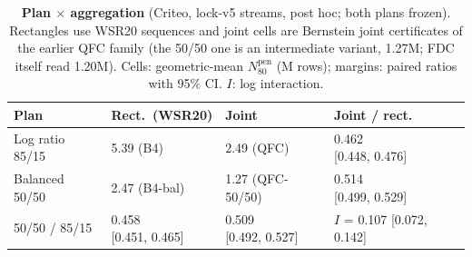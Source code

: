 \documentclass[sigconf,anonymous,review]{acmart}
\newcommand{\Npen}{N_{80}^{\text{pen}}}
\begin{document}
\begin{table}[H]
\caption{\textbf{Plan $\times$ aggregation} (Criteo, lock-v5 streams, post hoc; both plans frozen). Rectangles use WSR20 sequences and joint cells are Bernstein joint certificates of the earlier QFC family (the 50/50 one is an intermediate variant, 1.27M; FDC itself read 1.20M). Cells: geometric-mean $\Npen$ (M rows); margins: paired ratios with 95\% CI. $I$: log interaction.}
\label{tab:plan}
\footnotesize
\setlength{\tabcolsep}{3pt}
\begin{tabular}{@{}llll@{}}
\toprule
Plan & Rect.\ (WSR20) & Joint & Joint / rect. \\
\midrule
Log ratio 85/15 & 5.39 (B4) & 2.49 (QFC) & \makecell[l]{0.462\\{}[0.448, 0.476]} \\
Balanced 50/50 & 2.47 (B4-bal) & 1.27 (QFC-50/50) & \makecell[l]{0.514\\{}[0.499, 0.529]} \\
50/50 / 85/15 & \makecell[l]{0.458\\{}[0.451, 0.465]} & \makecell[l]{0.509\\{}[0.492, 0.527]} & \makecell[l]{$I$ = 0.107\\{}[0.072, 0.142]} \\
\bottomrule
\end{tabular}
\end{table}
\end{document}
